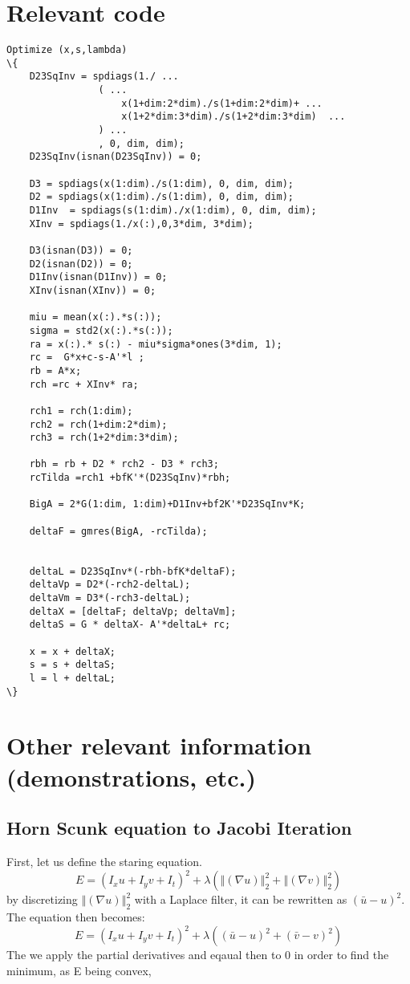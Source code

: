 \appendix
\chapter{Relevant code}

\begin{verbatim}
Optimize (x,s,lambda)
\{
	D23SqInv = spdiags(1./ ...
				( ... 
					x(1+dim:2*dim)./s(1+dim:2*dim)+ ...
					x(1+2*dim:3*dim)./s(1+2*dim:3*dim)  ...
				) ...
				, 0, dim, dim);
	D23SqInv(isnan(D23SqInv)) = 0;
	
	D3 = spdiags(x(1:dim)./s(1:dim), 0, dim, dim);
	D2 = spdiags(x(1:dim)./s(1:dim), 0, dim, dim);
	D1Inv  = spdiags(s(1:dim)./x(1:dim), 0, dim, dim);        
	XInv = spdiags(1./x(:),0,3*dim, 3*dim);
	
	D3(isnan(D3)) = 0;
	D2(isnan(D2)) = 0;
	D1Inv(isnan(D1Inv)) = 0;
	XInv(isnan(XInv)) = 0;
	
	miu = mean(x(:).*s(:));
	sigma = std2(x(:).*s(:));
	ra = x(:).* s(:) - miu*sigma*ones(3*dim, 1);
	rc =  G*x+c-s-A'*l ;
	rb = A*x;
	rch =rc + XInv* ra;
	
	rch1 = rch(1:dim);
	rch2 = rch(1+dim:2*dim);
	rch3 = rch(1+2*dim:3*dim);
	
	rbh = rb + D2 * rch2 - D3 * rch3;
	rcTilda =rch1 +bfK'*(D23SqInv)*rbh;
	
	BigA = 2*G(1:dim, 1:dim)+D1Inv+bf2K'*D23SqInv*K;
	
	deltaF = gmres(BigA, -rcTilda);
	
	
	deltaL = D23SqInv*(-rbh-bfK*deltaF);
	deltaVp = D2*(-rch2-deltaL);
	deltaVm = D3*(-rch3-deltaL);
	deltaX = [deltaF; deltaVp; deltaVm];
	deltaS = G * deltaX- A'*deltaL+ rc;
	
	x = x + deltaX;
	s = s + deltaS;
	l = l + deltaL;
\}
\end{verbatim}

\chapter{Other relevant information (demonstrations, etc.)}
\section{Horn Scunk equation to Jacobi Iteration} \label{GSDemo}
First, let us define the staring equation.
\begin{equation}
	E = (I_xu+ I_yv + I_t)^2 + \lambda(\left\Vert(\nabla u) \right\Vert_2^2 +\left\Vert(\nabla v)\right\Vert_2^2)
\end{equation}
by discretizing $\left\Vert(\nabla u) \right\Vert_2^2$ with a Laplace filter, it can be rewritten as $(\bar{u}-u)^2$. The equation then becomes:
\begin{equation}
E = (I_xu+ I_yv + I_t)^2 + \lambda((\bar{u}-u)^2+(\bar{v}-v)^2)
\end{equation}
The we apply the partial derivatives and eqaual then to 0 in order to find the minimum, as E being convex,

